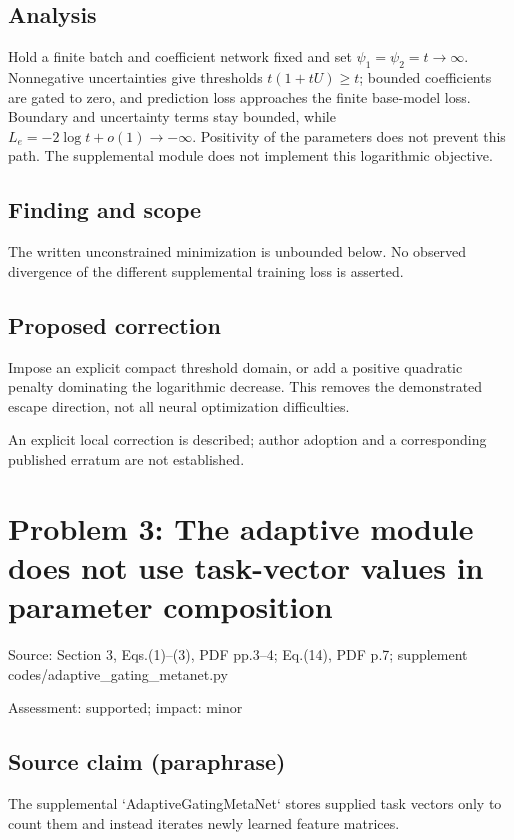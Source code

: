 \documentclass[11pt]{article}
\begin{document}
\subsection*{Analysis}

Hold a finite batch and coefficient network fixed and set \(\psi_1=\psi_2=t\to\infty\). Nonnegative uncertainties give thresholds \(t(1+tU)\geq t\); bounded coefficients are gated to zero, and prediction loss approaches the finite base-model loss. Boundary and uncertainty terms stay bounded, while \(L_e=-2\log t+o(1)\to-\infty\). Positivity of the parameters does not prevent this path. The supplemental module does not implement this logarithmic objective.

\subsection*{Finding and scope}

The written unconstrained minimization is unbounded below. No observed divergence of the different supplemental training loss is asserted.

\subsection*{Proposed correction}

Impose an explicit compact threshold domain, or add a positive quadratic penalty dominating the logarithmic decrease. This removes the demonstrated escape direction, not all neural optimization difficulties.

An explicit local correction is described; author adoption and a corresponding published erratum are not established.

\section*{Problem 3: The adaptive module does not use task-vector values in parameter composition}

Source: Section 3, Eqs.(1)–(3), PDF pp.3–4; Eq.(14), PDF p.7; supplement codes/adaptive\_gating\_metanet.py

Assessment: supported; impact: minor

\subsection*{Source claim (paraphrase)}

The supplemental `AdaptiveGatingMetaNet` stores supplied task vectors only to count them and instead iterates newly learned feature matrices.
\end{document}
